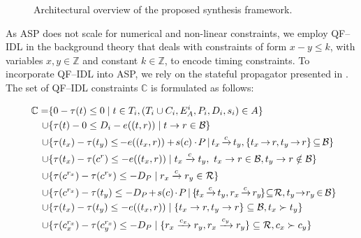 \label{subsec:scheduling}
\begin{figure}[t]
	\centering
	\resizebox{\linewidth}{!}{%
		
	}
	\vspace*{-7mm}
	\caption{Architectural overview of the proposed synthesis framework.}
	\label{fig:overview}
	\vspace*{-6mm}
\end{figure}
As ASP does not scale for numerical and non-linear constraints, we employ QF--IDL in the background theory that deals with constraints of form $x-y\leq k$,
with variables $x,y\in\mathbb{Z}$ and constant $k\in\mathbb{Z}$, to encode timing constraints.
To incorporate QF--IDL into ASP, we rely on the stateful propagator presented in \cite{gekakaosscwa16a}.
The set of QF--IDL constraints $\mathbb{C}$ is formulated as follows:\par
\vspace*{-6pt}
{\footnotesize
	\begin{align}
		\mathbb{C} =&\{0-\tau(t)\leq0 \mid t\in T_i,(T_i\cup C_i,E^i_A,P_i,D_i,s_i)\in A\}\label{const:zero}\\
		\cup&\{\tau(t)-0\leq D_i-e((t,r)) \mid t\rightarrow r \in \mathcal{B}\}\label{const:dl}\\
		\cup&\{\tau(t_x)-\tau(t_y)\leq\mkern-2mu -e((t_x,r))+\mkern-2mu s(c)\cdot\mkern-2mu P\mkern-2mu \mid\mkern-2mu t_x\mkern-2mu\xrightarrow{c}\mkern-2mu t_y,\{t_x\mkern-2mu\rightarrow\mkern-2mu r,t_y\mkern-2mu\rightarrow\mkern-2mu r\}\mkern-2mu \subseteq\mkern-2mu \mathcal{B}\}\mkern-4mu\label{const:commsame}\\
		\cup&\{\tau(t_x)-\tau(c^r)\leq -e((t_x,r)) \mid t_x\xrightarrow{c} t_y,\ t_x\rightarrow r\in \mathcal{B}, t_y\rightarrow r \notin \mathcal{B}\}\label{const:commfirst}\\
		\cup&\{\tau(c^{r_x})-\tau(c^{r_y})\leq -D_P \mid r_x\xrightarrow{c} r_y \in \mathcal{R}\}\label{const:commhop}\\
		\cup&\{\tau(c^{r_x})-\tau(t_y)\leq -D_P\mkern-2mu +\mkern-2mus(c)\mkern-2mu\cdot\mkern-2mu P\mkern-2mu \mid\mkern-2mu \{\mkern-2mu t_x\mkern-2mu\xrightarrow{c}\mkern-2mu t_y, r_x\mkern-2mu\xrightarrow{c}\mkern-2mu r_y\mkern-2mu\}\mkern-4mu \subseteq \mkern-4mu \mathcal{R},t_y\mkern-4mu\rightarrow\mkern-4mu r_y \mkern-2mu\in \mkern-2mu\mathcal{B}\}\mkern-10mu\label{const:commend}\\
		\cup&\{\tau(t_x)-\tau(t_y)\leq -e((t_x,r)) \mid \{t_x\rightarrow r,t_y\rightarrow r\} \subseteq \mathcal{B},t_x\succ t_y\}\label{const:taskorder}\\
		\cup&\{\tau(c_x^{r_x})-\tau(c_y^{r_x})\leq -D_P \mid \{r_x\xrightarrow{c_x}r_y,r_x\xrightarrow{c_y}r_y\} \subseteq \mathcal{R},c_x\succ c_y\}\label{const:commorder}
	\end{align}}

